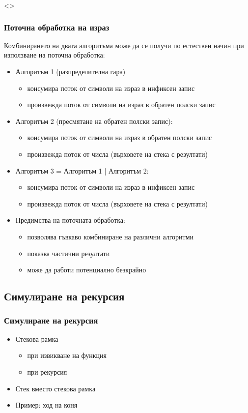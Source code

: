\documentclass[alsotrans, beameroptions={aspectratio=169}]{beamerswitch}
\begin{document}
\begin{frame}<>
  \frametitle{Поточна обработка на израз}
  Комбинирането на двата алгоритъма може да се получи по естествен начин при използване на \alert{поточна обработка}:\pause
  \begin{itemize}[<+->]
  \item Алгоритъм 1 (разпределителна гара)
    \begin{itemize}
    \item консумира поток от символи на израз в инфиксен запис
    \item произвежда поток от символи на израз в обратен полски запис
    \end{itemize}
  \item Алгоритъм 2 (пресмятане на обратен полски запис):
    \begin{itemize}
    \item консумира поток от символи на израз в обратен полски запис
    \item произвежда поток от числа (върховете на стека с резултати)
    \end{itemize}
  \item Алгоритъм 3 = Алгоритъм 1 | Алгоритъм 2:
    \begin{itemize}
    \item консумира поток от символи на израз в инфиксен запис
    \item произвежда поток от числа (върховете на стека с резултати)
    \end{itemize}
  \item Предимства на поточната обработка:
    \begin{itemize}
    \item позволява гъвкаво комбиниране на различни алгоритми
    \item показва частични резултати
    \item може да работи потенциално безкрайно
    \end{itemize}
  \end{itemize}
\end{frame}

\subsection{Симулиране на рекурсия}

\begin{frame}
  \frametitle{Симулиране на рекурсия}

  \begin{itemize}
  \item Стекова рамка
    \begin{itemize}
    \item при извикване на функция
    \item при рекурсия
    \end{itemize}
  \item Стек вместо стекова рамка
  \item Пример: ход на коня
  \end{itemize}
\end{frame}
\end{document}
